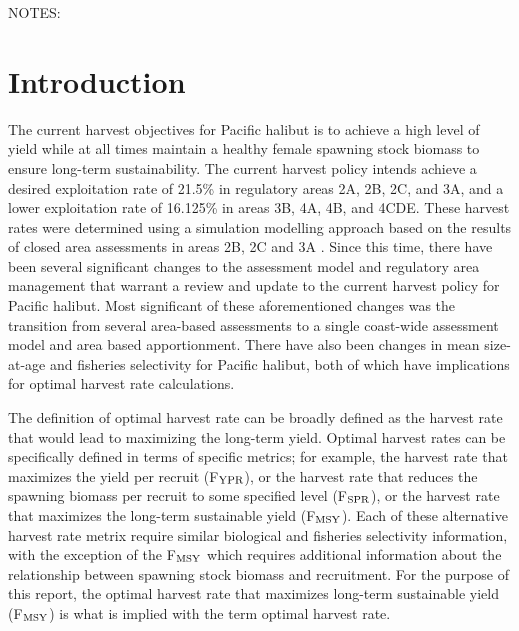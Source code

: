 % 

NOTES:






\section*{Introduction} %
\label{sec:introduction}
The current harvest objectives for Pacific halibut is to achieve a high level of yield while at all times maintain a healthy female spawning stock biomass to ensure long-term sustainability. The current harvest policy intends achieve a desired exploitation rate of 21.5\% in regulatory areas 2A, 2B, 2C, and 3A, and a lower exploitation rate of 16.125\% in areas 3B, 4A, 4B, and 4CDE.  These harvest rates were determined using a simulation modelling approach based on the results of closed area assessments in areas 2B, 2C and 3A \citep{clark2006assessment}.  Since this time, there have been several significant changes to the assessment model and regulatory area management that warrant a review and update to the current harvest policy for Pacific halibut.  Most significant of these aforementioned changes was the transition from several area-based assessments to a single coast-wide assessment model and area based apportionment.
There have also been changes in mean size-at-age and fisheries selectivity for Pacific halibut, both of which have implications for optimal harvest rate calculations.

The definition of optimal harvest rate can be broadly defined as the harvest rate that would lead to maximizing the long-term yield.  Optimal harvest rates can be specifically defined in terms of specific metrics; for example, the harvest rate that maximizes the yield per recruit (F$_{\rm{YPR}}$), or the harvest rate that reduces the spawning biomass per recruit to some specified level (F$_{\rm{SPR}}$), or the harvest rate that maximizes the long-term sustainable yield (F$_{\rm{MSY}}$).  Each of these alternative harvest rate metrix require similar biological and fisheries selectivity information, with the exception of the F$_{\rm{MSY}}$ which requires additional information about the relationship between spawning stock biomass and recruitment. For the purpose of this report, the optimal harvest rate that maximizes long-term sustainable yield (F$_{\rm{MSY}}$) is what is implied with the term optimal harvest rate.

